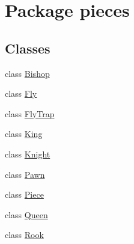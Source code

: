 \hypertarget{namespacepieces}{\section{Package pieces}
\label{namespacepieces}
}
\subsection*{Classes}
\begin{DoxyCompactItemize}
\item 
class \hyperlink{classpieces_1_1_bishop}{Bishop}
\item 
class \hyperlink{classpieces_1_1_fly}{Fly}
\item 
class \hyperlink{classpieces_1_1_fly_trap}{Fly\-Trap}
\item 
class \hyperlink{classpieces_1_1_king}{King}
\item 
class \hyperlink{classpieces_1_1_knight}{Knight}
\item 
class \hyperlink{classpieces_1_1_pawn}{Pawn}
\item 
class \hyperlink{classpieces_1_1_piece}{Piece}
\item 
class \hyperlink{classpieces_1_1_queen}{Queen}
\item 
class \hyperlink{classpieces_1_1_rook}{Rook}
\end{DoxyCompactItemize}
